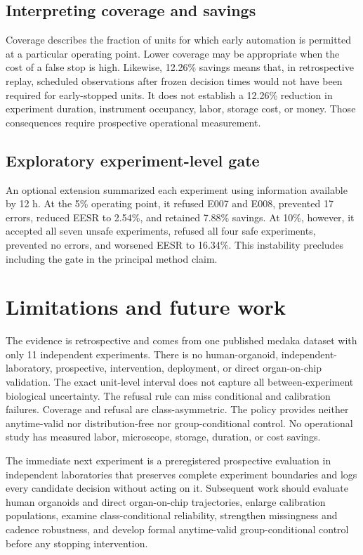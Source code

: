\documentclass[11pt,twocolumn]{article}
\newcommand{\pct}[1]{#1\%}
\begin{document}
\subsection{Interpreting coverage and savings}

Coverage describes the fraction of units for which early automation is permitted at a particular
operating point. Lower coverage may be appropriate when the cost of a false stop is high. Likewise,
\pct{12.26} savings means that, in retrospective replay, scheduled observations after frozen
decision times would not have been required for early-stopped units. It does not establish a
\pct{12.26} reduction in experiment duration, instrument occupancy, labor, storage cost, or money.
Those consequences require prospective operational measurement.

\subsection{Exploratory experiment-level gate}

An optional extension summarized each experiment using information available by 12 h. At the 5\%
operating point, it refused E007 and E008, prevented 17 errors, reduced EESR to \pct{2.54}, and
retained \pct{7.88} savings. At 10\%, however, it accepted all seven unsafe experiments, refused
all four safe experiments, prevented no errors, and worsened EESR to \pct{16.34}. This instability
precludes including the gate in the principal method claim.

\section{Limitations and future work}

The evidence is retrospective and comes from one published medaka dataset with only 11 independent
experiments. There is no human-organoid, independent-laboratory, prospective, intervention,
deployment, or direct organ-on-chip validation. The exact unit-level interval does not capture all
between-experiment biological uncertainty. The refusal rule can miss conditional and calibration
failures. Coverage and refusal are class-asymmetric. The policy provides neither anytime-valid nor
distribution-free nor group-conditional control. No operational study has measured labor,
microscope, storage, duration, or cost savings.

The immediate next experiment is a preregistered prospective evaluation in independent
laboratories that preserves complete experiment boundaries and logs every candidate decision
without acting on it. Subsequent work should evaluate human organoids and direct organ-on-chip
trajectories, enlarge calibration populations, examine class-conditional reliability, strengthen
missingness and cadence robustness, and develop formal anytime-valid group-conditional control
before any stopping intervention.
\end{document}
